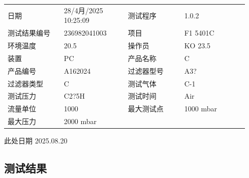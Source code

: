 \documentclass[UTF8,10pt,a4paper,fontset=fandol]{ctexart}
\newcommand{\fieldvalue}[1]{#1}
\newcommand{\handwritten}[1]{#1}
\begin{document}
\begin{tabular}{@{}p{0.22\linewidth}p{0.25\linewidth}p{0.22\linewidth}p{0.25\linewidth}@{}}
日期 &
\fieldvalue{28/4月/2025 10:25:09} &
测试程序 &
\fieldvalue{1.0.2}
\\[3pt]
测试结果编号 &
\fieldvalue{236982041003} &
项目 &
\fieldvalue{F1 5401C}
\\[3pt]
环境温度 &
\fieldvalue{20.5} &
操作员 &
\fieldvalue{KO 23.5}
\\[3pt]
装置 &
\fieldvalue{PC} &
产品名称 &
\fieldvalue{C}
\\[3pt]
产品编号 &
\fieldvalue{A162024} &
过滤器型号 &
\fieldvalue{A3?}
\\[3pt]
过滤器类型 &
\fieldvalue{C} &
测试气体 &
\fieldvalue{C-1}
\\[3pt]
测试压力 &
\fieldvalue{C2?5H} &
测试时间 &
\fieldvalue{Air}
\\[3pt]
流量单位 &
\fieldvalue{1000} &
最大测试点 &
\fieldvalue{1000 mbar}
\\[3pt]
最大压力 &
\fieldvalue{2000 mbar} &
&
\end{tabular}


\handwritten{此处日期 2025.08.20}

\subsection{测试结果}
\end{document}
